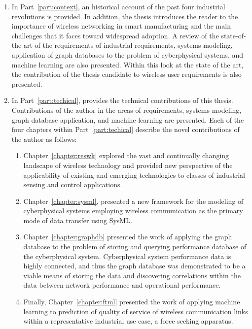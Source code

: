 \begin{enumerate}
	\item In Part~\ref{part:context}, an historical account of the past four industrial revolutions is provided.  In addition, the thesis introduces the reader to the importance of wireless networking in smart manufacturing and the main challenges that it faces toward widespread adoption. A review of the state-of-the-art of the requirements of industrial requirements, systems modeling, application of graph databases to the problem of cyberphysical systems, and machine learning are also presented.  Within this look at the state of the art, the contribution of the thesis candidate to wireless user requirements is also presented.
	\item In Part~\ref{part:techical}, provides the technical contributions of this thesis. Contributions of the author in the areas of requirements, systems modeling, graph database application, and machine learning are presented.  Each of the four chapters within Part~\ref{part:techical} describe the novel contributions of the author as follows:
	\begin{enumerate}
		
		\item Chapter~\ref{chapter:reswk} explored the vast and continually changing landscape of wireless technology and provided new perspective of the applicability of existing and emerging technologies to classes of industrial sensing and control applications.
		
		\item Chapter~\ref{chapter:sysml}, presented a new framework for the modeling of cyberphysical systems employing wireless communication as the primary mode of data transfer using SysML.
		
		\item Chapter~\ref{chapter:graphdb} presented the work of applying the graph database to the problem of storing and querying performance database of the cyberphysical system.  Cyberphysical system performance data is highly connected, and thus the graph database was demonstrated to be a viable means of storing the data and discovering correlations within the data between network performance and operational performance.
		
		\item Finally, Chapter~\ref{chapter:ftml} presented the work of applying machine learning to prediction of quality of service of wireless communication links within a representative industrial use case, a force seeking apparatus.
	\end{enumerate}
\end{enumerate}




